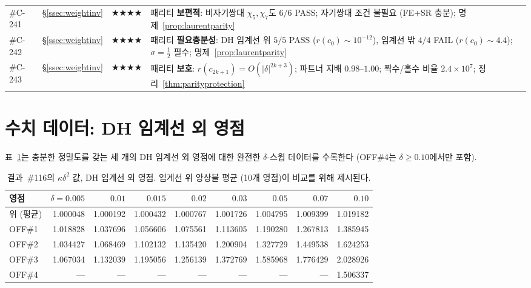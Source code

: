 \documentclass[11pt, a4paper]{article}
\theoremstyle{plain}
\theoremstyle{definition}
\begin{document}
\begin{longtable}{lllp{5.5cm}}
\#C-241 & \S\ref{ssec:weightinv} & \textbf{$\bigstar\bigstar\bigstar\bigstar$} & 패리티 \textbf{보편적}: 비자기쌍대 $\chi_5,\chi_7$도 $6/6$ PASS; 자기쌍대 조건 불필요 (FE+SR 충분); 명제~\ref{prop:laurentparity} \\
\#C-242 & \S\ref{ssec:weightinv} & \textbf{$\bigstar\bigstar\bigstar\bigstar$} & 패리티 \textbf{필요충분성}: DH 임계선 위 $5/5$ PASS ($r(c_0){\sim}10^{-12}$), 임계선 밖 $4/4$ FAIL ($r(c_0){\sim}4.4$); $\sigma{=}\tfrac{1}{2}$ 필수; 명제~\ref{prop:laurentparity} \\
\#C-243 & \S\ref{ssec:weightinv} & \textbf{$\bigstar\bigstar\bigstar\bigstar$} & 패리티 \textbf{보호}: $r(c_{2k{+}1}){=}O(|\delta|^{2k{+}3})$; 파트너 지배 $0.98$--$1.00$; 짝수/홀수 비율 $2.4{\times}10^{7}$; 정리~\ref{thm:parityprotection} \\
\end{longtable}


\section{수치 데이터: DH 임계선 외 영점}
\label{app:dhzeros}

표~\ref{tab:dhdata}는 충분한 정밀도를 갖는
세 개의 DH 임계선 외 영점에 대한 완전한 $\delta$-스윕 데이터를 수록한다
(OFF\#4는 $\delta\geq 0.10$에서만 포함).

\begin{table}[ht]
\centering
\caption{결과~\#116의 $\kappa\delta^{2}$ 값, DH 임계선 외 영점.
  임계선 위 앙상블 평균 (10개 영점)이 비교를 위해 제시된다.}
\label{tab:dhdata}
\small
\begin{tabular}{lrrrrrrrr}
\toprule
영점 & $\delta{=}0.005$ & $0.01$ & $0.015$ & $0.02$ & $0.03$ & $0.05$ & $0.07$ & $0.10$ \\
\midrule
위 (평균) & 1.000048 & 1.000192 & 1.000432 & 1.000767 & 1.001726 & 1.004795 & 1.009399 & 1.019182 \\
OFF\#1 & 1.018828 & 1.037696 & 1.056606 & 1.075561 & 1.113605 & 1.190280 & 1.267813 & 1.385945 \\
OFF\#2 & 1.034427 & 1.068469 & 1.102132 & 1.135420 & 1.200904 & 1.327729 & 1.449538 & 1.624253 \\
OFF\#3 & 1.067034 & 1.132039 & 1.195056 & 1.256139 & 1.372769 & 1.585968 & 1.776429 & 2.028926 \\
OFF\#4 & --- & --- & --- & --- & --- & --- & --- & 1.506337 \\
\bottomrule
\end{tabular}
\end{table}
\end{document}
